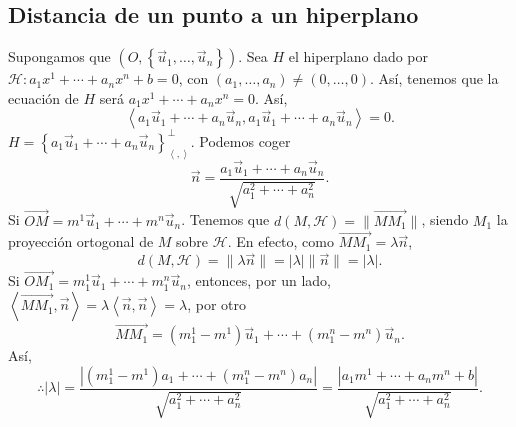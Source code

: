 \subsection{Distancia de un punto a un hiperplano}
Supongamos que $\displaystyle \left(O, \left\{ \vec{u}_{1}, \ldots, \vec{u}_{n}\right\} \right) $. Sea $\displaystyle H$ el hiperplano dado por $\displaystyle \mathcal{H} : a_{1}x^{1} + \cdots + a_{n}x^{n} + b = 0 $, con $\displaystyle \left(a_{1}, \ldots, a_{n}\right) \neq \left(0, \ldots, 0\right) $. Así, tenemos que la ecuación de $\displaystyle H $ será $\displaystyle a_{1}x^{1} + \cdots + a_{n}x^{n} = 0 $. Así, 
	\[ \left\langle a_{1}\vec{u}_{1} + \cdots + a_{n}\vec{u}_{n}, a_{1}\vec{u}_{1} + \cdots + a_{n}\vec{u}_{n} \right\rangle = 0 .\]
	$\displaystyle H = \left\{ a_{1}\vec{u}_{1} + \cdots + a_{n}\vec{u}_{n}\right\} ^{\perp }_{\left\langle ,  \right\rangle } $. Podemos coger
	\[\vec{n} = \frac{a_{1}\vec{u}_{1} + \cdots + a_{n}\vec{u}_{n}}{\sqrt{a^{2}_{1} + \cdots + a^{2}_{n}}} .\]
Si $\displaystyle \overrightarrow{OM} = m^{1}\vec{u}_{1} + \cdots + m^{n}\vec{u}_{n} $. Tenemos que $\displaystyle d\left(M, \mathcal{H}\right) = \|\overrightarrow{MM_{1}}\| $, siendo $\displaystyle M_{1} $ la proyección ortogonal de $\displaystyle M $ sobre $\displaystyle \mathcal{H} $. En efecto, como $\displaystyle \overrightarrow{MM_{1}} = \lambda \vec{n} $, 
\[d\left(M, \mathcal{H}\right) = \|\lambda \vec{n}\| = \left|\lambda \right|\|\vec{n}\| = \left|\lambda \right|.\]
Si $\displaystyle \overrightarrow{OM_{1}} = m_{1}^{1}\vec{u}_{1} + \cdots + m_{1}^{n}\vec{u}_{n} $, entonces, por un lado, $\displaystyle \left\langle \overrightarrow{MM_{1}}, \vec{n} \right\rangle  = \lambda \left\langle \vec{n}, \vec{n} \right\rangle = \lambda $, por otro
\[ \overrightarrow{MM_{1}} = \left(m^{1}_{1}-m^{1}\right)\vec{u}_{1} + \cdots + \left(m^{n}_{1}-m^{n}\right)\vec{u}_{n} .\]
Así, 
\[\therefore \left|\lambda \right| = \frac{ \left|\left(m^{1}_{1}-m^{1}\right)a_{1} + \cdots + \left(m^{n}_{1}-m^{n}\right)a_{n}\right|}{\sqrt{a^{2}_{1} + \cdots + a^{2}_{n}}} = \frac{ \left| a_{1}m^{1}+\cdots + a_{n}m^{n}+b\right|}{\sqrt{a^{2}_{1}+\cdots + a^{2}_{n}}}.\]
